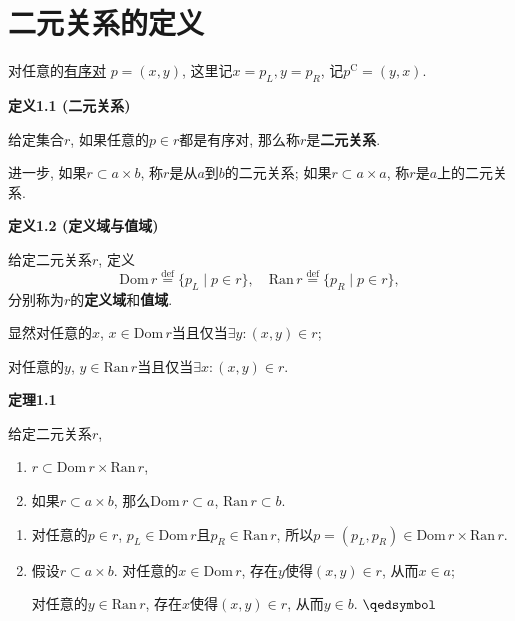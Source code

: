


\setlength{\abovedisplayskip}{1pt}
\setlength{\belowdisplayskip}{1pt}


\section{二元关系的定义}

对任意的\href{01 集合的简单运算#nameddest=sec:定义2.2}{有序对}
$p=(x,y)$, 这里记$x=p_L,y=p_R$, 记$p^\mathrm{C}=(y,x)$.

\vspace{10pt}

\hypertarget{sec:定义1.1}{}
\noindent\textbf{定义1.1 (二元关系)}

给定集合$r$, 如果任意的$p\in r$都是有序对, 那么称$r$是\textbf{二元关系}.

进一步, 如果$r\subset a\times b$, 称$r$是从$a$到$b$的二元关系;
如果$r\subset a\times a$, 称$r$是$a$上的二元关系.

\vspace{10pt}

\hypertarget{sec:定义1.2}{}
\noindent\textbf{定义1.2 (定义域与值域)}

给定二元关系$r$, 定义
\[
    \mathrm{Dom}\,r\overset{\mathrm{def}}{=}\{p_L\mid p\in r\},\quad
    \mathrm{Ran}\,r\overset{\mathrm{def}}{=}\{p_R\mid p\in r\},
\]
分别称为$r$的\textbf{定义域}和\textbf{值域}.

显然对任意的$x$, $x\in\mathrm{Dom}\,r$当且仅当$\exists y:(x,y)\in r$;

对任意的$y$, $y\in\mathrm{Ran}\,r$当且仅当$\exists x:(x,y)\in r$.

\vspace{10pt}

\hypertarget{sec:定理1.1}{}
\noindent\textbf{定理1.1}

给定二元关系$r$,
\begin{enumerate}
    \item $r\subset\mathrm{Dom}\,r\times\mathrm{Ran}\,r$,
    \item 如果$r\subset a\times b$,
    那么$\mathrm{Dom}\,r\subset a$, $\mathrm{Ran}\,r\subset b$.
\end{enumerate}


\begin{enumerate}
    \item 对任意的$p\in r$, $p_L\in\mathrm{Dom}\,r$且$p_R\in\mathrm{Ran}\,r$,
    所以$p=(p_L,p_R)\in\mathrm{Dom}\,r\times\mathrm{Ran}\,r$.
    \item 假设$r\subset a\times b$. 对任意的$x\in\mathrm{Dom}\,r$,
    存在$y$使得$(x,y)\in r$, 从而$x\in a$;

    \hspace{2.17em}
    对任意的$y\in\mathrm{Ran}\,r$, 存在$x$使得$(x,y)\in r$, 从而$y\in b$.
    \hfill $\qedsymbol$
\end{enumerate}


